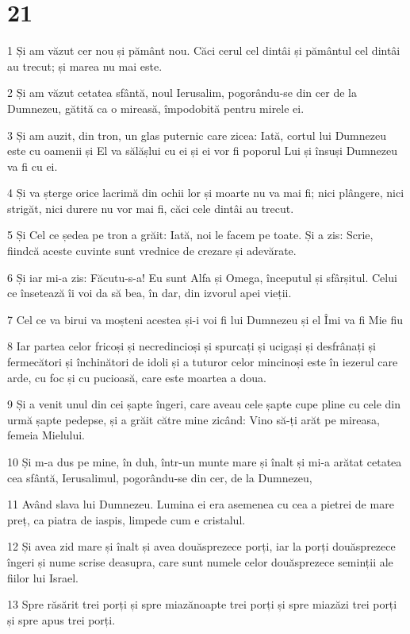 \chapter{21}

\par 1 Și am văzut cer nou și pământ nou. Căci cerul cel dintâi și pământul cel dintâi au trecut; și marea nu mai este.
\par 2 Și am văzut cetatea sfântă, noul Ierusalim, pogorându-se din cer de la Dumnezeu, gătită ca o mireasă, împodobită pentru mirele ei.
\par 3 Și am auzit, din tron, un glas puternic care zicea: Iată, cortul lui Dumnezeu este cu oamenii și El va sălășlui cu ei și ei vor fi poporul Lui și însuși Dumnezeu va fi cu ei.
\par 4 Și va șterge orice lacrimă din ochii lor și moarte nu va mai fi; nici plângere, nici strigăt, nici durere nu vor mai fi, căci cele dintâi au trecut.
\par 5 Și Cel ce ședea pe tron a grăit: Iată, noi le facem pe toate. Și a zis: Scrie, fiindcă aceste cuvinte sunt vrednice de crezare și adevărate.
\par 6 Și iar mi-a zis: Făcutu-s-a! Eu sunt Alfa și Omega, începutul și sfârșitul. Celui ce însetează îi voi da să bea, în dar, din izvorul apei vieții.
\par 7 Cel ce va birui va moșteni acestea și-i voi fi lui Dumnezeu și el Îmi va fi Mie fiu
\par 8 Iar partea celor fricoși și necredincioși și spurcați și ucigași și desfrânați și fermecători și închinători de idoli și a tuturor celor mincinoși este în iezerul care arde, cu foc și cu pucioasă, care este moartea a doua.
\par 9 Și a venit unul din cei șapte îngeri, care aveau cele șapte cupe pline cu cele din urmă șapte pedepse, și a grăit către mine zicând: Vino să-ți arăt pe mireasa, femeia Mielului.
\par 10 Și m-a dus pe mine, în duh, într-un munte mare și înalt și mi-a arătat cetatea cea sfântă, Ierusalimul, pogorându-se din cer, de la Dumnezeu,
\par 11 Având slava lui Dumnezeu. Lumina ei era asemenea cu cea a pietrei de mare preț, ca piatra de iaspis, limpede cum e cristalul.
\par 12 Și avea zid mare și înalt și avea douăsprezece porți, iar la porți douăsprezece îngeri și nume scrise deasupra, care sunt numele celor douăsprezece seminții ale fiilor lui Israel.
\par 13 Spre răsărit trei porți și spre miazănoapte trei porți și spre miazăzi trei porți și spre apus trei porți.
